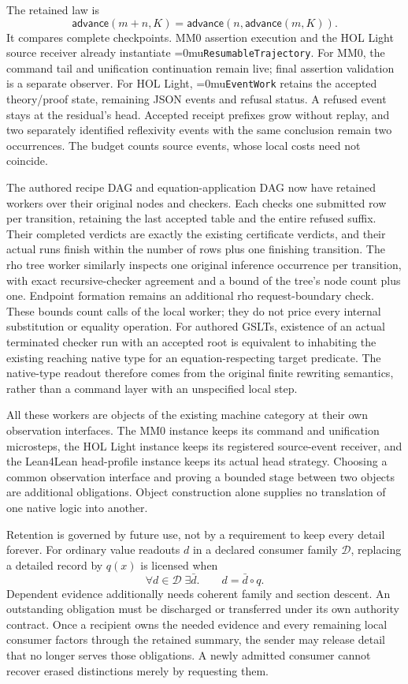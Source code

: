 \documentclass[11pt,a4paper]{article}
\newcommand{\name}[1]{\textup{\Urlmuskip=0mu\relax\nolinkurl{#1}}}
\begin{document}
The retained law is
\[
 \mathsf{advance}(m+n,K)
   =\mathsf{advance}(n,\mathsf{advance}(m,K)).
\]
It compares complete checkpoints. MM0 assertion execution and the HOL Light
source receiver already instantiate \name{ResumableTrajectory}. For MM0,
the command tail and unification continuation remain live; final assertion
validation is a separate observer. For HOL Light, \name{EventWork} retains
the accepted theory/proof state, remaining JSON events and refusal status.
A refused event stays at the residual's head. Accepted receipt prefixes grow
without replay, and two separately identified reflexivity events with the same
conclusion remain two occurrences. The budget counts source events, whose
local costs need not coincide.

The authored recipe DAG and equation-application DAG now have retained
workers over their original nodes and checkers. Each checks one submitted row
per transition, retaining the last accepted table and the entire refused
suffix. Their completed verdicts are exactly the existing certificate
verdicts, and their actual runs finish within the number of rows plus one
finishing transition. The rho tree worker similarly inspects one original
inference occurrence per transition, with exact recursive-checker agreement
and a bound of the tree's node count plus one. Endpoint formation remains an
additional rho request-boundary check. These bounds count calls of the local
worker; they do not price every internal substitution or equality operation.
For authored GSLTs, existence of an actual terminated checker run with an
accepted root is equivalent to inhabiting the existing reaching native type
for an equation-respecting target predicate. The native-type readout therefore
comes from the original finite rewriting semantics, rather than a command
layer with an unspecified local step.

All these workers are objects of the existing machine category at their own
observation interfaces. The MM0 instance keeps its command and unification
microsteps, the HOL Light instance keeps its registered source-event receiver,
and the Lean4Lean head-profile instance keeps its actual head strategy.
Choosing a common observation interface and proving a bounded stage between
two objects are additional obligations. Object construction alone supplies
no translation of one native logic into another.

Retention is governed by future use, not by a requirement to keep every detail
forever. For ordinary value readouts $d$ in a declared consumer family $\mathcal D$,
replacing a detailed record by $q(x)$ is licensed when
\[
       \forall d\in\mathcal D\;\exists\bar d.\qquad d=\bar d\circ q.
\]
Dependent evidence additionally needs coherent family and section descent.
An outstanding obligation must be discharged or transferred under its own
authority contract. Once a recipient owns the needed evidence and every
remaining local consumer factors through the retained summary, the sender
may release detail that no longer serves those obligations. A newly admitted
consumer cannot recover erased distinctions merely by requesting them.
\end{document}
